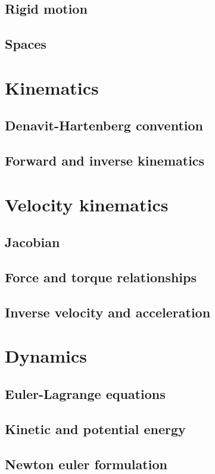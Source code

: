 \subsection{Rigid motion}
\subsection{Spaces}

\section{Kinematics}
\lipsum[1]
\subsection{Denavit-Hartenberg convention}
\subsection{Forward and inverse kinematics}

\section{Velocity kinematics}
\lipsum[1]
\subsection{Jacobian}
\subsection{Force and torque relationships}
\subsection{Inverse velocity and acceleration}

\section{Dynamics}
\lipsum[1]
\subsection{Euler-Lagrange equations}
\subsection{Kinetic and potential energy}
\subsection{Newton euler formulation}